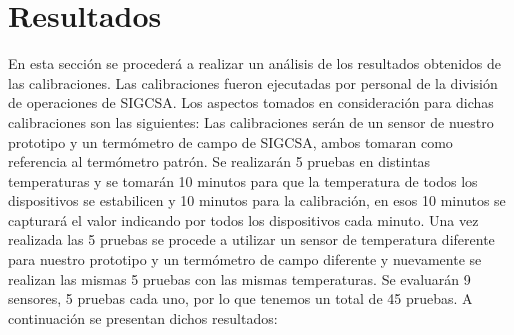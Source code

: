 \section{Resultados}

\par 
En esta sección se procederá a realizar un análisis de los resultados obtenidos de las calibraciones. Las calibraciones fueron ejecutadas por personal de la división de operaciones de SIGCSA. Los aspectos tomados en consideración para dichas calibraciones son las siguientes: Las calibraciones serán de un sensor de nuestro prototipo y un termómetro de campo de SIGCSA, ambos tomaran como referencia al termómetro patrón. Se realizarán 5 pruebas en distintas temperaturas y se tomarán 10 minutos para que la temperatura de todos los dispositivos se estabilicen y 10 minutos para la calibración, en esos 10 minutos se capturará el valor indicando por todos los dispositivos cada minuto. Una vez realizada las 5 pruebas se procede a utilizar un sensor de temperatura diferente para nuestro prototipo y un termómetro de campo diferente y nuevamente se realizan las mismas 5 pruebas con las mismas temperaturas. Se evaluarán 9 sensores, 5 pruebas cada uno, por lo que tenemos un total de 45 pruebas. A continuación se presentan dichos resultados: 











\clearpage
